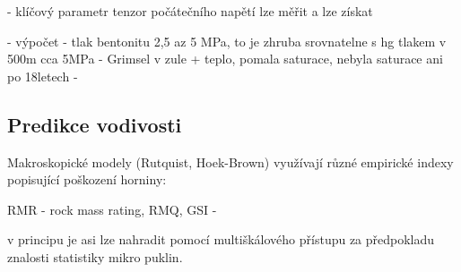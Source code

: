\documentclass{article}
\begin{document}
- klíčový parametr tenzor počátečního napětí
  lze měřit a lze získat 

- výpočet 
- tlak bentonitu 2,5 az 5 MPa, to je zhruba srovnatelne s hg tlakem v 500m cca 5MPa
- Grimsel v zule + teplo, pomala saturace, nebyla saturace ani po 18letech
- 

\subsection{Predikce vodivosti}
Makroskopické modely (Rutquist, Hoek-Brown) využívají různé empirické indexy popisující poškození horniny:

RMR - rock mass rating, RMQ, GSI -

v principu je asi lze nahradit pomocí multiškálového přístupu za předpokladu znalosti 
statistiky mikro puklin.
\end{document}
